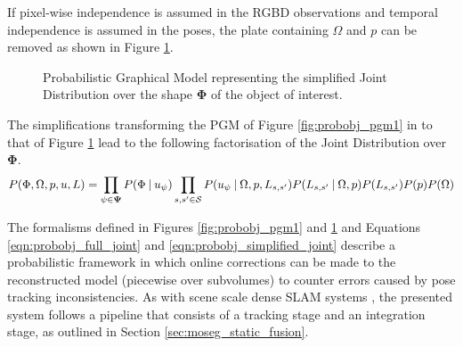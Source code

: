 If pixel-wise independence is assumed in the RGBD observations and temporal
independence is assumed in the poses, the plate containing $\Omega$ and $p$ can
be removed as shown in Figure \ref{fig:probobj_pgm2}.
\begin{figure}[ht]
  \label{fig:probobj_pgm2}
  \centering
  \caption[Probabilistic Object Reconstruction Formulation II]
  {Probabilistic Graphical Model representing the simplified Joint
    Distribution over the shape $\mathbf{\Phi}$ of the object of interest.}
\end{figure}

The simplifications transforming the PGM of Figure \ref{fig:probobj_pgm1} in to
that of Figure \ref{fig:probobj_pgm2} lead to the following factorisation of the
Joint Distribution over $\mathbf{\Phi}$.
\begin{equation}
  \label{eqn:probobj_simplified_joint}
  P(\Phi, \Omega, p, u, L) = 
  \prod_{\psi \in \mathbf{\Psi}}P(\Phi \:\vert\: u_{\psi})
  \prod_{s, s' \in \mathcal{S}}P(u_{\psi} \:\vert\: \Omega, p, L_{s, s'})
  P(L_{s, s'} \:\vert\: \Omega, p) P(L_{s, s'})P(p)P(\Omega)
\end{equation}

The formalisms defined in Figures \ref{fig:probobj_pgm1} and
\ref{fig:probobj_pgm2} and Equations \ref{eqn:probobj_full_joint} and
\ref{eqn:probobj_simplified_joint} describe a probabilistic framework in which
online corrections can be made to the reconstructed model (piecewise over
subvolumes) to counter errors caused by pose tracking inconsistencies. As with
scene scale dense SLAM systems \cite{Newcombe2011, Prisacariu2014, Niessner2013},
the presented system follows a pipeline that consists of a tracking stage and an
integration stage, as outlined in Section \ref{sec:moseg_static_fusion}.

